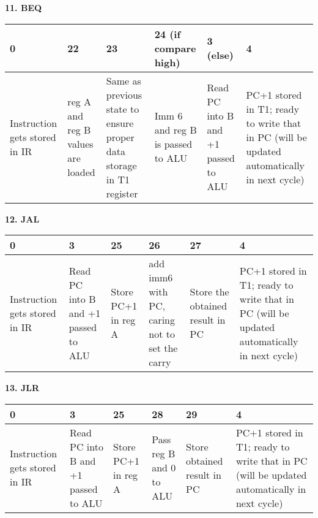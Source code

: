 \documentclass[11pt,fleqn,oneside]{book} %
\begin{document}
\vspace{0.5cm}

\textbf{11. BEQ }
\begin{center}
 \begin{tabular}{ | m{5em} | m{5em} | m{5em} | m{5em} | m{5em} |  m{7em} |} 
 \hline
 0 & 22 & 23 & 24 (if compare high) & 3 (else) & 4 \\ [0.5ex]
 \hline
 Instruction gets stored in IR & reg A and reg B values are loaded & Same as previous state to ensure proper data storage in T1 register & Imm 6 and reg B is passed to ALU & Read PC into B and +1 passed to ALU & PC+1 stored in T1; ready to write that in PC (will be updated automatically in next cycle)\\ [1ex]
 \hline
\end{tabular}
\end{center}


\textbf{12. JAL }
\begin{center}
 \begin{tabular}{ | m{5em} | m{5em} | m{5em} | m{5em} | m{5em} |  m{7em} |} 
 \hline
 0 & 3 & 25 & 26 & 27 & 4 \\ [0.5ex]
 \hline
 Instruction gets stored in IR & Read PC into B and +1 passed to ALU & Store PC+1 in reg A & add imm6 with PC, caring not to set the carry & Store the obtained result in PC & PC+1 stored in T1; ready to write that in PC (will be updated automatically in next cycle)\\ [1ex]
 \hline
\end{tabular}
\end{center}
 
\vspace{0.5cm}

\textbf{13. JLR }
\begin{center}
 \begin{tabular}{ | m{5em} | m{5em} | m{5em} | m{5em} | m{5em} |  m{7em} |} 
 \hline
 0 & 3 & 25 & 28 & 29 & 4 \\ [0.5ex]
 \hline
 Instruction gets stored in IR & Read PC into B and +1 passed to ALU & Store PC+1 in reg A & Pass reg B and 0 to ALU & Store obtained result in PC & PC+1 stored in T1; ready to write that in PC (will be updated automatically in next cycle)\\ [1ex]
 \hline
\end{tabular}
\end{center}

\vspace{0.5cm}
\end{document}
